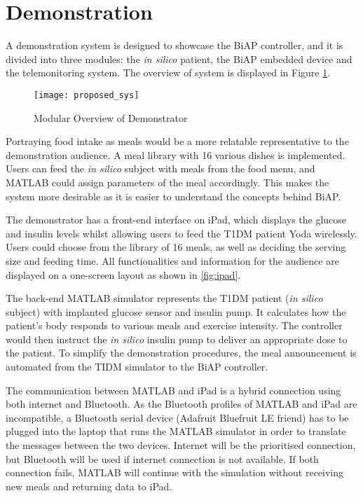 \documentclass[conference,final,9pt,twocolumn,a4paper]{IEEEtran}
\begin{document}


\section{Demonstration}

A demonstration system is designed to showcase the BiAP controller, and it is divided into three modules: the \textit{in silico} patient, the BiAP embedded device and the telemonitoring system. The overview of system is displayed in Figure \ref{fig:demo_sys}. 

\begin{figure}[h]
    \centerline{\texttt{[image: proposed\_sys]}}
    \caption{Modular Overview of Demonstrator}
    \label{fig:demo_sys}
\end{figure} 

Portraying food intake as meals would be a more relatable representative to the demonstration audience. A meal library with 16 various dishes is implemented. Users can feed the \textit{in silico} subject with meals from the food menu, and MATLAB could assign parameters of the meal accordingly. This makes the system more desirable as it is easier to understand the concepts behind BiAP.

The demonstrator has a front-end interface on iPad, which displays the glucose and insulin levels whilst allowing users to feed the T1DM patient Yoda wirelessly. Users could choose from the library of 16 meals, as well as deciding the serving size and feeding time. All functionalities and information for the audience are displayed on a one-screen layout as shown in \ref{fig:ipad}.

The back-end MATLAB simulator represents the T1DM patient (\textit{in silico} subject) with implanted glucose sensor and insulin pump. It calculates how the patient’s body responds to various meals and exercise intensity. The controller would then instruct the \textit{in silico} insulin pump to deliver an appropriate dose to the patient. To simplify the demonstration procedures, the meal announcement is automated from the TIDM simulator to the BiAP controller.

The communication between MATLAB and iPad is a hybrid connection using both internet and Bluetooth. As the Bluetooth profiles of MATLAB and iPad are incompatible, a Bluetooth serial device (Adafruit Bluefruit LE friend) has to be plugged into the laptop that runs the MATLAB simulator in order to translate the messages between the two devices. Internet will be the prioritised connection, but Bluetooth will be used if internet connection is not available. If both connection fails, MATLAB will continue with the simulation without receiving new meals and returning data to iPad. 
\end{document}
